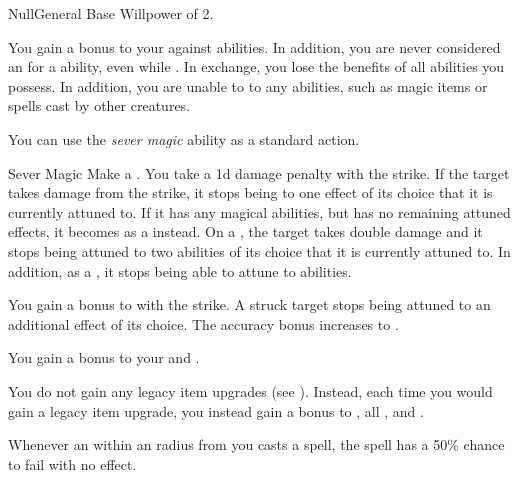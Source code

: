     \begin{feat}{Null}{General}
        \featpre Base Willpower of 2.

         You gain a  bonus to your  against  abilities.
        In addition, you are never considered an  for a  ability, even while \unconscious.
        In exchange, you lose the benefits of all  abilities you possess.
        In addition, you are unable to  to any  abilities, such as magic items or spells cast by other creatures.

         You can use the \textit{sever magic} ability as a standard action.
        \begin{freeability}{Sever Magic}
            Make a .
            You take a \minus1d damage penalty with the strike.
            If the target takes damage from the strike, it stops being  to one effect of its choice that it is currently attuned to.
            If it has any magical abilities, but has no remaining attuned effects, it becomes \dazed as a  instead.
            On a , the target takes double damage and it stops being attuned to two abilities of its choice that it is currently attuned to.
            In addition, as a , it stops being able to attune to abilities.

            \rankline
             You gain a  bonus to  with the strike.
             A struck target stops being attuned to an additional effect of its choice.
             The accuracy bonus increases to .
        \end{freeability}

         You gain a  bonus to your  and .

         You do not gain any legacy item upgrades (see ).
        Instead, each time you would gain a legacy item upgrade, you instead gain a  bonus to , all , and .

         Whenever an  within an \areamed radius from you casts a spell, the spell has a 50\% chance to fail with no effect.


\end{feat}
